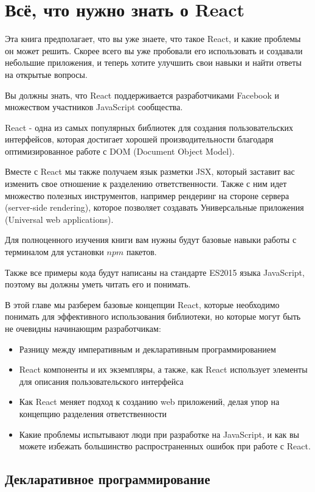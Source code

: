 \chapter{Всё, что нужно знать о React}

Эта книга предполагает, что вы уже знаете, что такое React, и какие проблемы он может решить. Скорее всего вы уже пробовали его использовать и создавали небольшие приложения, и теперь хотите улучшить свои навыки и найти ответы на открытые вопросы.

Вы должны знать, что React поддерживается разработчиками Facebook и множеством участников JavaScript сообщества.

React - одна из самых популярных библиотек для создания пользовательских интерфейсов, которая достигает хорошей производительности благодаря оптимизированное работе с DOM (Document Object Model).

Вместе с React мы также получаем язык разметки JSX, который заставит вас изменить свое отношение к разделению ответственности. Также с ним идет множество полезных инструментов, например рендеринг на стороне сервера (server-side rendering), которое позволяет создавать Универсальные приложения (Universal web applications).

Для полноценного изучения книги вам нужны будут базовые навыки работы с терминалом для установки $npm$ пакетов.

Также все примеры кода будут написаны на стандарте ES2015 языка JavaScript, поэтому вы должны уметь читать его и понимать.

В этой главе мы разберем базовые концепции React, которые необходимо понимать для эффективного использования библиотеки, но которые могут быть не очевидны начинающим разработчикам:

\begin{itemize}
  \item Разницу между императивным и декларативным программированием
  \item React компоненты и их экземпляры, а также, как React использует элементы для описания пользовательского интерфейса
  \item Как React меняет подход к созданию web приложений, делая упор на концепцию разделения ответственности
  \item Какие проблемы испытывают люди при разработке на JavaScript, и как вы можете избежать большинство распространенных ошибок при работе с React.
\end{itemize}


\section{Декларативное программирование}

